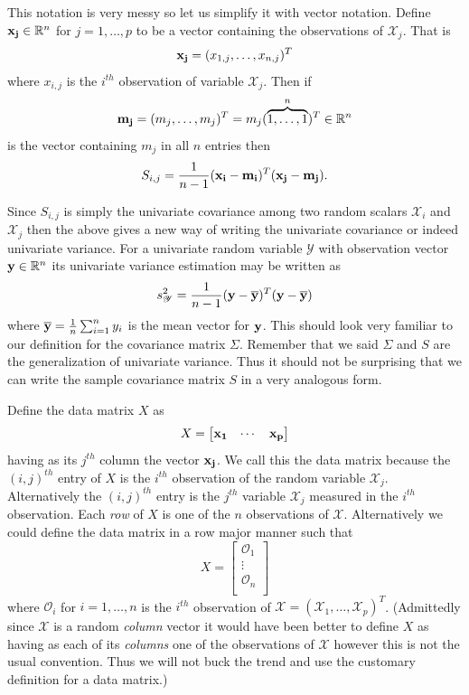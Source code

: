 \documentclass{book}
\newcommand{\bs}[1]{\boldsymbol{#1}}
\newcommand{\rv}[1]{\bs{\mathscr{#1}}}
\begin{document}
This notation is very messy so let us simplify it with vector notation. Define ${\bf x_j}\in\mathbb{R}^n$ for $j=1,\ldots,p$ to be a vector containing the observations of $\mathscr{X}_j$. That is 
$$
{\bf x_j}=(x_{1,j},\ldots,x_{n,j})^T
$$
where $x_{i,j}$ is the $i^{th}$ observation of variable $\mathscr{X}_j$. Then if 
$$
{\bf m_j}=(m_j,\ldots,m_j)^T=m_j(\overset{n}{\overbrace{1,\ldots,1}})^T\in\mathbb{R}^n
$$ 
is the vector containing $m_j$ in all $n$ entries then
$$
S_{i,j}=\frac{1}{n-1}({\bf x_i}-{\bf m_i})^T({\bf x_j}-{\bf m_j}).
$$

Since $S_{i,j}$ is simply the univariate covariance among two random scalars $\mathscr{X}_i$ and $\mathscr{X}_j$ then the above gives a new way of writing the univariate covariance or indeed univariate variance. For a univariate random variable $\mathscr{Y}$ with observation vector ${\bf y}\in\mathbb{R}^n$ its univariate variance estimation may be written as
$$
s_\mathscr{Y}^2=\frac{1}{n-1}({\bf y}-{\overline {\bf y}})^T({\bf y}-{\overline {\bf y}})
$$
where $\overline{{\bf y}}=\frac{1}{n}\sum_{i=1}^{n}y_i$ is the mean vector for ${\bf y}$. This should look very familiar to our definition for the covariance matrix $\Sigma$. Remember that we said $\Sigma$ and $S$ are the generalization of univariate variance. Thus it should not be surprising that we can write the sample covariance matrix $S$ in a very analogous form. 

Define the data matrix $X$ as
$$
X=
\begin{bmatrix}
{\bf x_1}& \cdots& {\bf x_p}
\end{bmatrix}
$$
having as its $j^{th}$ column the vector ${\bf x_j}$. We call this the data matrix because the $(i,j)^{th}$ entry of $X$ is the $i^{th}$ observation of the random variable $\mathscr{X}_j$. Alternatively the $(i,j)^{th}$ entry is the $j^{th}$ variable $\mathscr{X}_j$ measured in the $i^{th}$ observation. Each \emph{row} of $X$ is one of the $n$ observations of $\rv{X}$. Alternatively we could define the data matrix in a row major manner such that 
$$
X=\begin{bmatrix}
\mathscr{O}_1\\
\vdots\\
\mathscr{O}_n\\
\end{bmatrix}
$$
where $\mathscr{O}_i$ for $i=1,\ldots,n$ is the $i^{th}$ observation of $\rv{X}=(\mathscr{X}_1,\ldots,\mathscr{X}_p)^T$. (Admittedly since $\rv{X}$ is a random \emph{column} vector it would have been better to define $X$ as having as each of its \emph{columns} one of the observations of $\rv{X}$ however this is not the usual convention. Thus we will not buck the trend and use the customary definition for a data matrix.)
\end{document}
